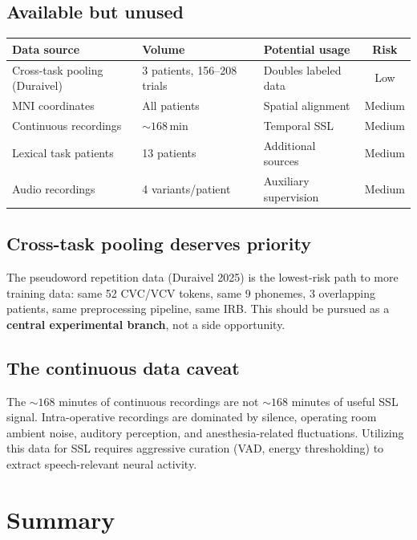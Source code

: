 \documentclass[11pt,letterpaper]{article}
\begin{document}
\subsection{Available but unused}

\begin{table}[h]
\centering\small
\begin{tabular}{@{}lllc@{}}
\toprule
\textbf{Data source} & \textbf{Volume} & \textbf{Potential usage} & \textbf{Risk} \\
\midrule
Cross-task pooling (Duraivel) & 3 patients, 156--208 trials & Doubles labeled data & Low \\
MNI coordinates & All patients & Spatial alignment & Medium \\
Continuous recordings & ${\sim}168$\,min & Temporal SSL & Medium \\
Lexical task patients & 13 patients & Additional sources & Medium \\
Audio recordings & 4 variants/patient & Auxiliary supervision & Medium \\
\bottomrule
\end{tabular}
\end{table}

\subsection{Cross-task pooling deserves priority}

The pseudoword repetition data (Duraivel 2025) is the lowest-risk path to more training data: same 52 CVC/VCV tokens, same 9 phonemes, 3 overlapping patients, same preprocessing pipeline, same IRB. This should be pursued as a \textbf{central experimental branch}, not a side opportunity.

\subsection{The continuous data caveat}

The ${\sim}168$ minutes of continuous recordings are not ${\sim}168$ minutes of useful SSL signal. Intra-operative recordings are dominated by silence, operating room ambient noise, auditory perception, and anesthesia-related fluctuations. Utilizing this data for SSL requires aggressive curation (VAD, energy thresholding) to extract speech-relevant neural activity.


\section{Summary}
\end{document}
